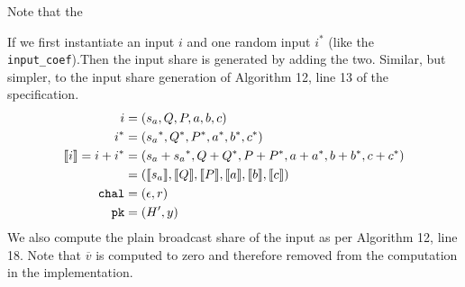 \documentclass[11pt]{report}
\theoremstyle{definition}
\theoremstyle{plain}
\begin{document}
Note that the

If we first instantiate an input $i$ and one random input $i^*$ (like the \texttt{input\_coef}).Then the input share is generated by adding the two. Similar, but simpler, to the input share generation of Algorithm 12, line 13 of the specification.
\begin{align*}
  i                & = (s_a, Q, P, a,b,c)                                             \\
  i^*              & = ({s_a}^*, Q^*, P^*, a^*,b^*,c^*)                               \\
  \llbracket i \rrbracket = i + i^* & = ({s_a} + {s_a}^*, Q + Q^*, P + P^*, a + a^*, b + b^*, c + c^*) \\
                   & = (\llbracket s_a \rrbracket, \llbracket Q \rrbracket, \llbracket P \rrbracket, \llbracket a \rrbracket, \llbracket b \rrbracket, \llbracket c \rrbracket)             \\
  \texttt{chal}    & = (\epsilon, r)                                                  \\
  \texttt{pk}      & = (H', y)
\end{align*}
We also compute the plain broadcast share of the input as per Algorithm 12, line 18. Note that $\overline{v}$ is computed to zero and therefore removed from the computation in the implementation.
\end{document}
